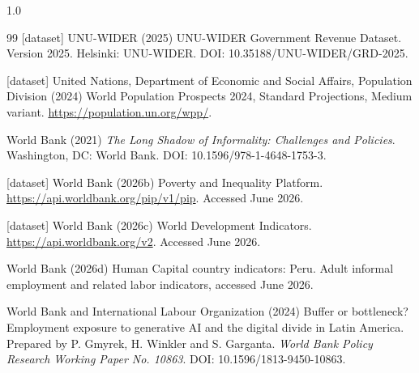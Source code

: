 \documentclass[11pt,a4paper]{article}
\begin{document}
\begin{spacing}{1.0}
\begin{thebibliography}{99}
[dataset] UNU-WIDER (2025)
\newblock UNU-WIDER Government Revenue Dataset. Version 2025.
\newblock Helsinki: UNU-WIDER. DOI: 10.35188/UNU-WIDER/GRD-2025.

[dataset] United Nations, Department of Economic and Social Affairs, Population Division (2024)
\newblock World Population Prospects 2024, Standard Projections, Medium variant.
\newblock \url{https://population.un.org/wpp/}.

World Bank (2021)
\newblock \emph{The Long Shadow of Informality: Challenges and Policies}.
\newblock Washington, DC: World Bank. DOI: 10.1596/978-1-4648-1753-3.


[dataset] World Bank (2026b)
\newblock Poverty and Inequality Platform.
\newblock \url{https://api.worldbank.org/pip/v1/pip}. Accessed June 2026.

[dataset] World Bank (2026c)
\newblock World Development Indicators.
\newblock \url{https://api.worldbank.org/v2}. Accessed June 2026.

World Bank (2026d)
\newblock Human Capital country indicators: Peru.
\newblock Adult informal employment and related labor indicators, accessed June 2026.

World Bank and International Labour Organization (2024)
\newblock Buffer or bottleneck? Employment exposure to generative AI and the digital divide in Latin America. Prepared by P. Gmyrek, H. Winkler and S. Garganta.
\newblock \emph{World Bank Policy Research Working Paper No. 10863}. DOI: 10.1596/1813-9450-10863.

\end{thebibliography}
\end{spacing}
\end{document}
